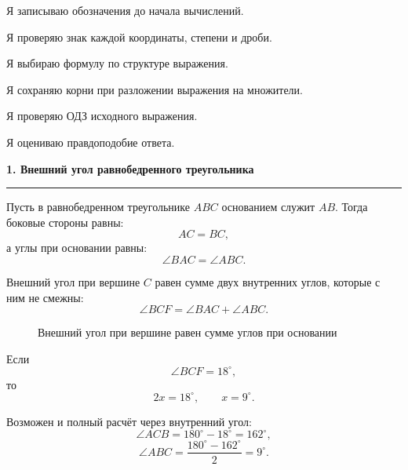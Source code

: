 \documentclass[a4paper,12pt]{article}
\newcommand{\topic}[1]{%
  \par\bigskip
  {\Large\bfseries\color{darkaccent}#1\par}
  \vspace{0.2em}
  {\color{accent}\rule{\linewidth}{0.7pt}}
  \vspace{0.55em}
}
\begin{document}
\begin{checklist}
  \item Я записываю обозначения до начала вычислений.
  \item Я проверяю знак каждой координаты, степени и дроби.
  \item Я выбираю формулу по структуре выражения.
  \item Я сохраняю корни при разложении выражения на множители.
  \item Я проверяю ОДЗ исходного выражения.
  \item Я оцениваю правдоподобие ответа.
\end{checklist}

\topic{1. Внешний угол равнобедренного треугольника}

Пусть в равнобедренном треугольнике \(ABC\) основанием служит
\(AB\). Тогда боковые стороны равны:
\[
AC=BC,
\]
а углы при основании равны:
\[
\angle BAC=\angle ABC.
\]

Внешний угол при вершине \(C\) равен сумме двух внутренних углов,
которые с ним не смежны:
\[
\angle BCF=\angle BAC+\angle ABC.
\]

\begin{figure}[htbp]
  \centering
  \caption{Внешний угол при вершине равен сумме углов при основании}
\end{figure}

Если
\[
\angle BCF=18^\circ,
\]
то
\[
2x=18^\circ,
\qquad
x=9^\circ.
\]

Возможен и полный расчёт через внутренний угол:
\[
\angle ACB=180^\circ-18^\circ=162^\circ,
\]
\[
\angle ABC
=
\frac{180^\circ-162^\circ}{2}
=
9^\circ.
\]
\end{document}
